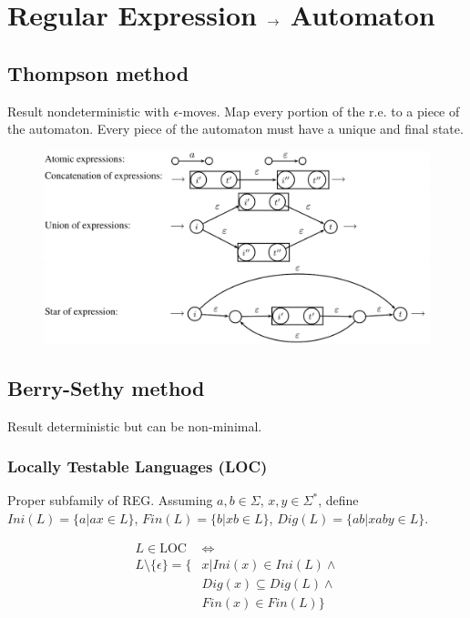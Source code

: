 \section{Regular Expression $\rightarrow$ Automaton}

\subsection{Thompson method}
Result nondeterministic with $\epsilon$-moves. Map every portion of the r.e. to a piece of the automaton. Every piece of the automaton must have a unique and final state.

\begin{figure}[H]
    \centering
    \includegraphics[width=\linewidth]{automata/thompson.png}
\end{figure}

\subsection{Berry-Sethy method}

Result deterministic but can be non-minimal.

\subsubsection{Locally Testable Languages (LOC)}

Proper subfamily of REG. Assuming $a,b \in \Sigma$, $x, y \in \Sigma^*$, define $Ini(L) = \{a | ax \in L\}$, $Fin(L) = \{b | xb \in L\}$, $Dig(L) = \{ab | xaby \in L\}$.

\begin{align*}
    L \in \text{LOC} &\iff \\
    L \setminus \{\epsilon\} = \{&x | Ini(x) \in Ini(L) \land \\
    &Dig(x) \subseteq Dig(L) \land \\
    &Fin(x) \in Fin(L) \}
\end{align*}

